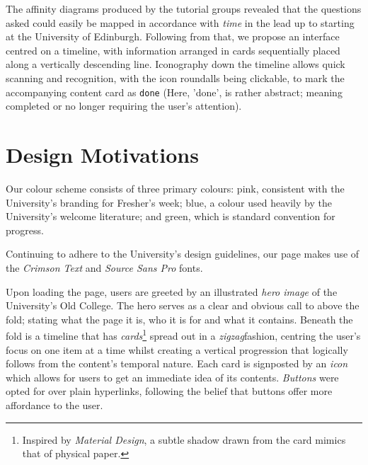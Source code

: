 \documentclass[a4paper, notoc]{tufte-handout}
\begin{document}
The affinity diagrams produced by the tutorial groups revealed that the questions asked could easily be mapped in accordance with \textit{time} in the lead up to starting at the University of Edinburgh. Following from that, we propose an interface centred on a timeline, with information arranged in cards sequentially placed along a vertically descending line. Iconography down the timeline allows quick scanning and recognition, with the icon roundalls being clickable, to mark the accompanying content card as \texttt{done} (Here, 'done', is rather abstract; meaning completed or no longer requiring the user's attention).
\section{Design Motivations}\label{design-motivations}

Our colour scheme consists of three primary colours: pink, consistent with the University's branding for Fresher's week; blue, a colour used heavily by the University's welcome literature; and green, which is standard convention for progress.

Continuing to adhere to the University's design guidelines, our page makes use of the \textit{Crimson Text} and \textit{Source Sans Pro} fonts.

Upon loading the page, users are greeted by an illustrated \textit{hero image} of the University's Old College. The hero serves as a clear and obvious call to above the fold; stating what the page it is, who it is for and what it contains. Beneath the fold is a timeline that has \textit{cards}\footnote{Inspired by \textit{Material Design}, a subtle shadow drawn from the card mimics that of physical paper.} spread out in a \textit{zigzag}fashion, centring the user's focus on one item at a time whilst creating a vertical progression that logically follows from the content's temporal nature. Each card is signposted by an \textit{icon} which allows for users to get an immediate idea of its contents. \textit{Buttons} were opted for over plain hyperlinks, following the belief that buttons offer more affordance to the user.


%
\end{document}
